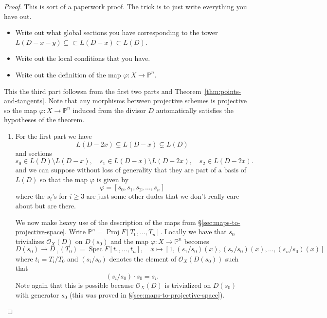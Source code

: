 \documentclass[12pt]{article}
\numberwithin{equation}{section}
\theoremstyle{definition}
\theoremstyle{remark}
\newcommand{\Ocal}{\mathcal{O}}
\newcommand{\PP}{\mathbb{P}}
\newcommand{\Spec}{\operatorname{Spec}}
\newcommand{\Proj}{\operatorname{Proj}}
\begin{document}
\begin{proof}
	This is sort of a paperwork proof. 
	The trick is to just write everything you have out.
	\begin{itemize}
		\item Write out what global sections you have corresponding to the tower $L(D-x-y) \subsetneq \subset L(D-x) \subset L(D)$. 
		\item Write out the local conditions that you have. 
		\item Write out the definition of the map $\varphi: X \to \PP^n$. 
	\end{itemize}
This the third part followsn from the first two parts and Theorem~\ref{thm:points-and-tangents}. 
Note that any morphisms between projective schemes is projective so the map $\varphi: X \to \PP^n$ induced from the divisor $D$ automatically satisfies the hypotheses of the theorem. 

\begin{enumerate}
\item For the first part we have 
 $$ L(D-2x) \subsetneq L(D-x) \subsetneq L(D) $$
and sections 
$$s_0 \in L(D)\setminus L(D-x), \quad s_1 \in L(D-x)\setminus L(D-2x), \quad s_2 \in L(D-2x).$$
and we can suppose without loss of generality that they are part of a basis of $L(D)$ so that the map $\varphi$ is given by
 $$ \varphi = [s_0,s_1,s_2,\ldots, s_n ] $$
where the $s_i$'s for $i\geq 3$ are just some other dudes that we don't really care about but are there.

We now make heavy use of the description of the maps from \S\ref{sec:maps-to-projective-space}.
Write $\PP^n = \Proj F[T_0,\ldots,T_n]$.
Locally we have that $s_0$ trivializes $\Ocal_X(D)$ on $D(s_0)$ and the map $\varphi: X\to \PP^n$ becomes
 $$ D(s_0) \to D_+(T_0) = \Spec F[t_1,\ldots,t_n], \quad x\mapsto [1, (s_1/s_0)(x), (s_2/s_0)(x), \ldots, (s_n/s_0)(x)] $$
where $t_i = T_i/T_0$ and $(s_i/s_0)$ denotes the element of $\Ocal_X(D(s_0))$ such that 
 $$ (s_i/s_0)\cdot s_0 = s_i. $$ 
Note again that this is possible because $\Ocal_X(D)$ is trivialized on $D(s_0)$ with generator $s_0$ (this was proved in \S\ref{sec:maps-to-projective-space}).


\end{enumerate}
\end{proof}
\end{document}
